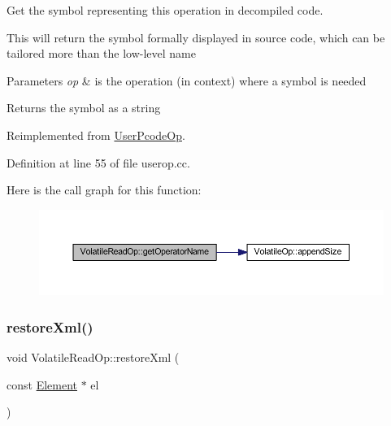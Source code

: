 Get the symbol representing this operation in decompiled code. 

This will return the symbol formally displayed in source code, which can be tailored more than the low-\/level name 
\begin{DoxyParams}{Parameters}
{\em op} & is the operation (in context) where a symbol is needed \\
\hline
\end{DoxyParams}
\begin{DoxyReturn}{Returns}
the symbol as a string 
\end{DoxyReturn}


Reimplemented from \mbox{\hyperlink{class_user_pcode_op_a7529472e93f9077d5bfdb9cc1142bfbb}{User\+Pcode\+Op}}.



Definition at line 55 of file userop.\+cc.

Here is the call graph for this function\+:
\nopagebreak
\begin{figure}[H]
\begin{center}
\leavevmode
\includegraphics[width=350pt]{class_volatile_read_op_afb60313306e36c095f37000b325142a0_cgraph}
\end{center}
\end{figure}
\mbox{\label{class_volatile_read_op_abdb0f4262d311abca0c8a3fe07ed758e}} 
\subsubsection{\texorpdfstring{restoreXml()}{restoreXml()}}
{\footnotesize\ttfamily void Volatile\+Read\+Op\+::restore\+Xml (\begin{DoxyParamCaption}\item[{const \mbox{\hyperlink{class_element}{Element}} $\ast$}]{el }\end{DoxyParamCaption})\hspace{0.3cm}{\ttfamily [virtual]}}



